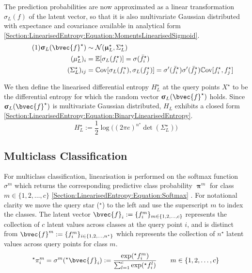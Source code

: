 \documentclass{article}
\renewcommand{\vec}[1]{\boldsymbol{#1}}
\newcommand\numberthis{\addtocounter{equation}{1}\tag{\theequation}}
\begin{document}
			The prediction probabilities are now approximated as a linear transformation $\sigma_{L}(f)$ of the latent vector, so that it is also multivariate Gaussian distributed with expectance and covariance available in analytical form \eqref{Section:LinearisedEntropy:Equation:MomentsLinearisedSigmoid}. \begin{align*}
			\numberthis \label{Section:LinearisedEntropy:Equation:MomentsLinearisedSigmoid}
					\vec{\upsigma}_{L}(\bvec{f}^{\star}) & \sim \mathcal{N}(\vec{\upmu}^{\star}_{L}, \Sigma^{\star}_{L}) \\
					({\mu^{\star}_{L}})_{i} & = \mathbb{E}[\sigma_{L}(f^{\star}_{i})] = \sigma(\bar{f}^{\star}_{i}) \\
					({\Sigma^{\star}_{L}})_{ij} & = \mathbb{C}\mathrm{ov}[\sigma_{L}(f^{\star}_{i}), \sigma_{L}(f^{\star}_{j})] = \sigma'(\bar{f}^{\star}_{i}) \sigma'(\bar{f}^{\star}_{j}) \mathbb{C}\mathrm{ov}[f^{\star}_{i}, f^{\star}_{j}]
			\end{align*}
			
			We then define the linearised differential entropy $H^{\star}_{L}$ at the query points $X^{\star}$ to be the differential entropy for which the random vector $\vec{\upsigma}_{L}(\bvec{f}^{\star})$ holds. Since $\vec{\upsigma}_{L}(\bvec{f}^{\star})$ is multivariate Gaussian distributed, $H_{L}$ exhibits a closed form \eqref{Section:LinearisedEntropy:Equation:BinaryLinearisedEntropy}. \begin{equation}
				H^{\star}_{L} := \frac{1}{2} \log\Big((2 \pi e)^{n^{\star}} \det(\Sigma^{\star}_{L})\Big)
			\label{Section:LinearisedEntropy:Equation:BinaryLinearisedEntropy}
			\end{equation}			
					
	\subsection{Multiclass Classification}
			
		For multiclass classification, linearisation is performed on the softmax function $\sigma^{m}$ which returns the corresponding predictive class probability $\vec{\uppi}^{m}$ for class $m \in \{1, 2, \dots, c\}$ \eqref{Section:LinearisedEntropy:Equation:Softmax} \cite{GaussianProcessForMachineLearning}. For notational clarity we move the query star ($^\star$) to the left and use the superscript $m$ to index the classes. The latent vector $\bvec{f}_{i} := \{f^{m}_{i}\}_{m \in \{1, 2, \dots, c\}}$ represents the collection of $c$ latent values across classes at the query point $i$, and is distinct from $\bvec{f}^{m} := \{f^{m}_{i}\}_{i \in \{1, 2, \dots, n^{\star}\}}$ which represents the collection of $n^{\star}$ latent values across query points for class $m$. \begin{equation}
			^{\star}\pi^{m}_{i} = \sigma^{m}(^{\star}\bvec{f}_{i}) := \frac{\exp(^{\star}f^{m}_{i})}{\sum_{l = 1}^{c} \exp(^{\star}f^{l}_{i})} \qquad m \in \{1, 2, \dots, c\}
		\label{Section:LinearisedEntropy:Equation:Softmax}
		\end{equation}
		
\end{document}
